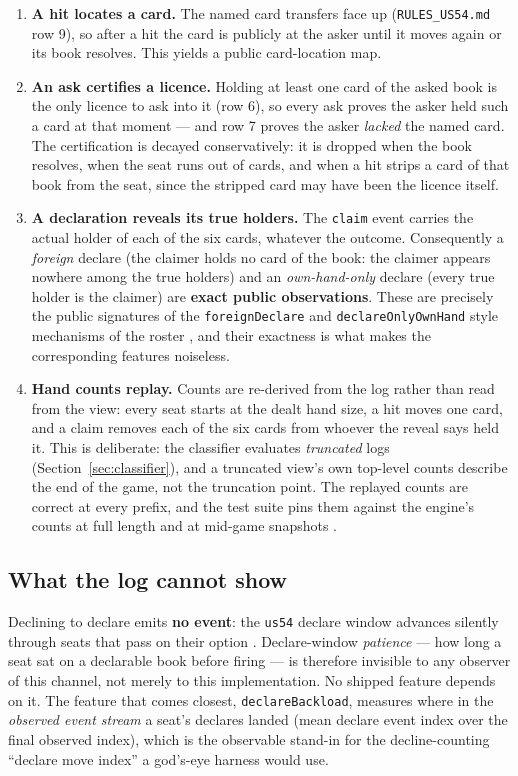 \documentclass[11pt]{article}
\newcommand{\code}[1]{\texttt{#1}}
\newcommand{\usff}{\code{us54}}
\begin{document}
\begin{enumerate}
\item \textbf{A hit locates a card.} The named card transfers face up
  (\code{RULES\_US54.md} row 9), so after a hit the card is publicly at the asker until it
  moves again or its book resolves. This yields a public card-location map.
\item \textbf{An ask certifies a licence.} Holding at least one card of the asked book is the
  only licence to ask into it (row 6), so every ask proves the asker held such a card at that
  moment --- and row 7 proves the asker \emph{lacked} the named card. The certification is
  decayed conservatively: it is dropped when the book resolves, when the seat runs out of
  cards, and when a hit strips a card of that book from the seat, since the stripped card may
  have been the licence itself.
\item \textbf{A declaration reveals its true holders.} The \code{claim} event carries the
  actual holder of each of the six cards, whatever the outcome. Consequently a \emph{foreign}
  declare (the claimer holds no card of the book: the claimer appears nowhere among the true
  holders) and an \emph{own-hand-only} declare (every true holder is the claimer) are
  \textbf{exact public observations}. These are precisely the public signatures of the
  \code{foreignDeclare} and \code{declareOnlyOwnHand} style mechanisms of the roster
  \cite{styles,v05}, and their exactness is what makes the corresponding features noiseless.
\item \textbf{Hand counts replay.} Counts are re-derived from the log rather than read from
  the view: every seat starts at the dealt hand size, a hit moves one card, and a claim
  removes each of the six cards from whoever the reveal says held it. This is deliberate:
  the classifier evaluates \emph{truncated} logs (Section~\ref{sec:classifier}), and a
  truncated view's own top-level counts describe the end of the game, not the truncation
  point. The replayed counts are correct at every prefix, and the test suite pins them
  against the engine's counts at full length and at mid-game snapshots \cite{repo}.
\end{enumerate}

\subsection{What the log cannot show}
\label{sec:blind}

Declining to declare emits \textbf{no event}: the \usff{} declare window advances silently
through seats that pass on their option \cite{rules,repo}. Declare-window \emph{patience} ---
how long a seat sat on a declarable book before firing --- is therefore invisible to any
observer of this channel, not merely to this implementation. No shipped feature depends on
it. The feature that comes closest, \code{declareBackload}, measures where in the
\emph{observed event stream} a seat's declares landed (mean declare event index over the
final observed index), which is the observable stand-in for the decline-counting
``declare move index'' a god's-eye harness would use.
\end{document}
